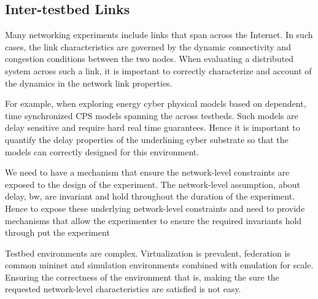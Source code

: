 \subsection{Inter-testbed Links}
Many networking experiments include links 
 that span across the Internet. 
In such cases, the link characteristics are governed by the dynamic 
 connectivity and congestion conditions between the two nodes. 
When evaluating a distributed system across 
 such a link, it is important to 
correctly characterize and account of the dynamics in the 
 network link properties. 
 
For example, when exploring energy cyber physical models
 based on dependent, time synchronized
CPS models spanning the across testbeds.
Such models are delay sensitive and require hard 
 real time guarantees. Hence it is important
to quantify the delay properties of the underlining cyber
substrate so that the models can correctly designed for
this environment.



We need to have a mechanism that  
 ensure the network-level constraints are exposed 
  to the design of the experiment. 
The network-level assumption, about delay, bw, are invariant 
 and hold throughout the duration of the 
experiment. 
Hence to expose these underlying network-level 
  constraints and need to provide mechanisms that allow the 
  experimenter to ensure the required invariants hold 
  through put the experiment    

Testbed environments are complex. 
Virtualization is prevalent, federation is common 
 mininet and simulation environments combined 
  with emulation for scale. 
 Ensuring the correctness of the environment 
  that is, making the sure the requested 
  network-level characteristics are satisfied is not easy. 
  


     
 
 


